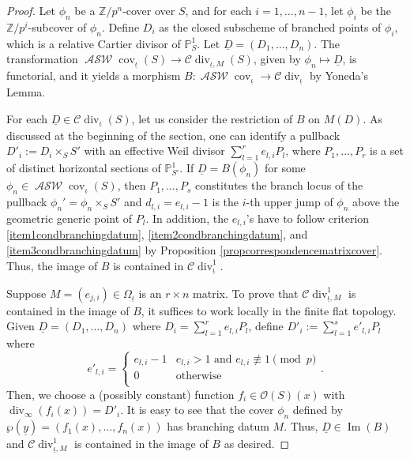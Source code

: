 \documentclass{compositio}
\theoremstyle{remark}
\theoremstyle{remark}
\DeclareMathOperator{\cov}{cov}
\DeclareMathOperator{\divisor}{div}
\DeclareMathOperator{\Image}{Im}
\DeclareMathOperator{\ASW}{\mathcal{ASW}}
\begin{document}
\begin{proof}
    Let $\phi_n$ be a $\mathbb{Z}/p^n$-cover over $S$, and for each $i = 1, \ldots, n-1$, let $\phi_i$ be the $\mathbb{Z}/p^i$-subcover of $\phi_n$. Define $D_i$ as the closed subscheme of branched points of $\phi_i$, which is a relative Cartier divisor of $\mathbb{P}^1_S$. Let $\underline{D} = (D_1, \ldots, D_n)$. The transformation $\ASW\cov_{\underline{\iota}} (S) \rightarrow \mathcal{C} \divisor_{\underline{\iota}, M}(S)$, given by $\phi_n \mapsto \underline{D}$, is functorial, and it yields a morphism $B: \ASW\cov_{\underline{\iota}} \rightarrow \mathcal{C} \divisor_{\underline{\iota}}$ by Yoneda's Lemma.

For each $\underline{D} \in \mathcal{C} \divisor_{\underline{\iota}}(S)$, let us consider the restriction of $B$ on $M(D)$. As discussed at the beginning of the section, one can identify a pullback $D'_i :=D_i \times_S S'$ with an effective Weil divisor $\sum_{l=1}^r e_{l, i} P_l$, where ${ P_1, \ldots, P_r }$ is a set of distinct horizontal sections of $\mathbb{P}^1_{S'}$. If $\underline{D}=B(\phi_n)$ for some $\phi_n \in \ASW\cov_{\underline{\iota}}(S)$, then ${P_1, \ldots, P_s}$ constitutes the branch locus of the pullback $\phi_n'=\phi_n \times_S S'$ and $d_{l,i}=e_{l,i}-1$ is the $i$-th upper jump of $\phi_n$ above the geometric generic point of $P_l$. In addition, the $e_{l,i}$'s have to follow criterion \ref{item1condbranchingdatum}, \ref{item2condbranchingdatum}, and \ref{item3condbranchingdatum} by Proposition \ref{propcorrespondencematrixcover}. Thus, the image of $B$ is contained in $\mathcal{C} \divisor^1_{\underline{\iota}}$.

Suppose $M=(e_{j,i}) \in \Omega_{\underline{\iota}}$ is an $r \times n$ matrix. To prove that $\mathcal{C} \divisor^1_{\underline{\iota}, M}$ is contained in the image of $B$, it suffices to work locally in the finite flat topology. Given $\underline{D}=(D_1, \ldots, D_n)$ where $D_i =\sum_{l=1}^r e_{l,i} P_l$, define $D'_i :=\sum_{l=1}^s e'_{l,i} P_l$ where
\[e'_{l,i}= \begin{cases} 
      e_{l,i}-1 & e_{l,i} > 1 \text{ and } e_{l,i} \not\equiv 1 \pmod{p} \\
      0 &\text{otherwise}  \\
   \end{cases}.
\]
Then, we choose a (possibly constant) function $f_i \in \mathcal{O}(S)(x)$ with $\divisor_{\infty}(f_i(x))=D'_i$. It is easy to see that the cover $\phi_n$ defined by $\wp(\underline{y})=(f_1(x), \ldots, f_n(x))$ has branching datum $M$. Thus, $\underline{D} \in \Image(B)$ and $\mathcal{C} \divisor^1_{\underline{\iota}, M}$ is contained in the image of $B$ as desired.
\end{proof}
\end{document}
